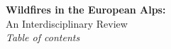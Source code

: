 \documentclass[11pt,a4paper]{article}
\begin{document}
\begin{center}
{\Large\bfseries Wildfires in the European Alps:}\\[2mm]
{\large An Interdisciplinary Review}\\[4mm]
{\itshape Table of contents}
\end{center}

\vspace{4mm}

\makeatletter
{}
\makeatother
\end{document}

